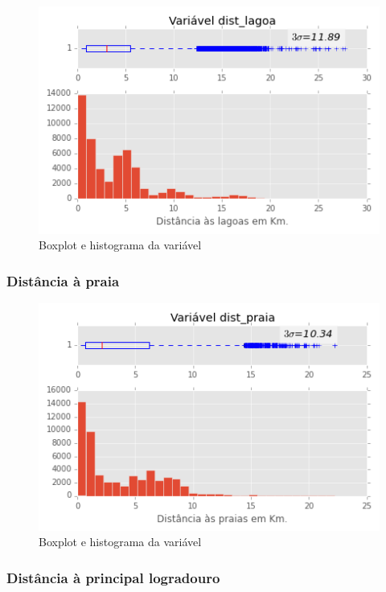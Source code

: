 \begin{figure}[H]
	\centering
	\includegraphics[width=0.8\linewidth]{img/var_dist_lagoa_boxhist}
	\caption{Boxplot e histograma da variável }
	\label{fig:var_dist_lagoa_boxhist}
\end{figure} 

\subsubsection{Distância à praia}

\begin{figure}[H]
	\centering
	\includegraphics[width=0.8\linewidth]{img/var_dist_praia_boxhist}
	\caption{Boxplot e histograma da variável }
	\label{fig:var_dist_praia_boxhist}
\end{figure} 

\subsubsection{Distância à principal logradouro}

